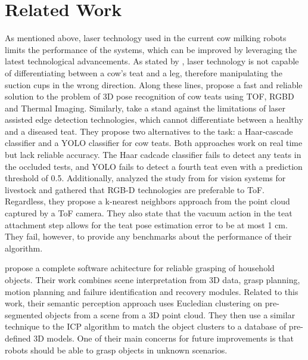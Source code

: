 \section{Related Work}\label{chap:1:related-work}
As mentioned above, laser technology used in the current cow milking robots limits the performance of the systems, which can be improved by leveraging the latest technological advancements. As stated by \textcite{pal2017algorithm}, laser technology is not capable of differentiating between a cow's teat and a leg, therefore manipulating the suction cups in the wrong direction. Along these lines, \citeauthor{pal2017algorithm} propose a fast and reliable solution to the problem of 3D pose recognition of cow teats using TOF, RGBD and Thermal Imaging. 
Similarly, \citeauthor{rastogi2019teat} take a stand against the limitations of laser assisted edge detection technologies, which cannot differentiate between a healthy and a diseased teat. They propose two alternatives to the task: a Haar-cascade classifier and a YOLO classifier for cow teats. Both approaches work on real time but lack reliable accuracy. The Haar cadcade classifier fails to detect any teats in the occluded tests, and YOLO fails to detect a fourth teat even with a prediction threshold of 0.5.
Additionally, \textcite{dorokhov2019recognition} analyzed the study from \textcite{akhloufi20143d} for vision systems for livestock and gathered that RGB-D technologies are preferable to ToF. Regardless, they propose a k-nearest neighbors approach from the point cloud captured by a ToF camera. They also state that the vacuum action in the teat attachment step allows for the teat pose estimation error to be at most 1 cm. They fail, however, to provide any benchmarks about the performance of their algorithm.

\textcite{ciocarlie2014towards} propose a complete software achitecture for reliable grasping of household objects. Their work combines scene interpretation from 3D data, grasp planning, motion planning and failure identification and recovery modules. Related to this work, their semantic perception approach uses Eucledian clustering on pre-segmented objects from a scene from a 3D point cloud. They then use a similar technique to the ICP algorithm to match the object clusters to a database of pre-defined 3D models. One of their main concerns for future improvements is that robots should be able to grasp objects in unknown scenarios.

